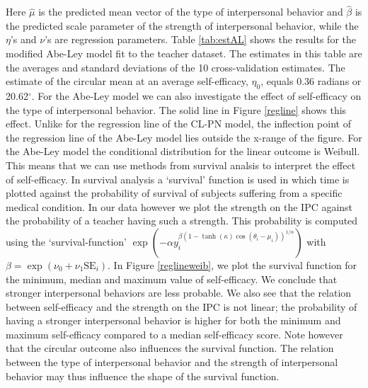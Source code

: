 \documentclass[12pt,]{article}
\begin{document}
\noindent Here \(\hat{\mu}\) is the predicted mean vector of the type of
interpersonal behavior and \(\hat{\beta}\) is the predicted scale
parameter of the strength of interpersonal behavior, while the
\(\eta\)'s and \(\nu\)'s are regression parameters.\newline
\indent Table \ref{tab:estAL} shows the results for the modified Abe-Ley
model fit to the teacher dataset. The estimates in this table are the
averages and standard deviations of the 10 cross-validation estimates.
The estimate of the circular mean at an average self-efficacy,
\(\eta_0\), equals 0.36 radians or 20.62\(^\circ\). For the Abe-Ley
model we can also investigate the effect of self-efficacy on the type of
interpersonal behavior. The solid line in Figure \ref{regline} shows
this effect. Unlike for the regression line of the CL-PN model, the
inflection point of the regression line of the Abe-Ley model lies
outside the x-range of the figure. \newline
\indent For the Abe-Ley model the conditional distribution for the
linear outcome is Weibull. This means that we can use methods from
survival analsis to interpret the effect of self-efficacy. In survival
analysis a `survival' function is used in which time is plotted against
the probability of survival of subjects suffering from a specific
medical condition. In our data however we plot the strength on the IPC
against the probability of a teacher having such a strength. This
probability is computed using the `survival-function'
\(\exp(-\alpha y_i^{\beta(1-\tanh(\kappa)\cos(\theta_i - \mu_i))^{1/\alpha}})\)
with \(\beta = \exp(\nu_0 + \nu_1\mbox{SE}_i)\). In Figure
\ref{reglineweib}, we plot the survival function for the minimum, median
and maximum value of self-efficacy. We conclude that stronger
interpersonal behaviors are less probable. We also see that the relation
between self-efficacy and the strength on the IPC is not linear; the
probability of having a stronger interpersonal behavior is higher for
both the minimum and maximum self-efficacy compared to a median
self-efficacy score. Note however that the circular outcome also
influences the survival function. The relation between the type of
interpersonal behavior and the strength of interpersonal behavior may
thus influence the shape of the survival function.\newline
\end{document}
